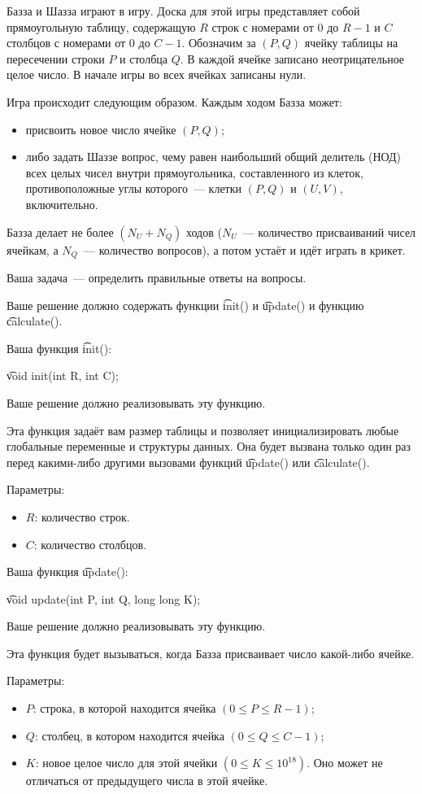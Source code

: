 Базза и Шазза играют в игру. Доска для этой игры представляет собой прямоугольную таблицу, содержащую $R$ строк с номерами от $0$ до $R - 1$ и $C$ столбцов с номерами от $0$ до $C - 1$. Обозначим за $(P, Q)$ ячейку таблицы на пересечении строки $P$ и столбца $Q$. В каждой ячейке записано неотрицательное целое число. В начале игры во всех ячейках записаны нули.

Игра происходит следующим образом. Каждым ходом Базза может:
\begin{itemize}
\item присвоить новое число ячейке $(P, Q)$;
\item либо задать Шаззе вопрос, чему равен наибольший общий делитель (НОД) всех целых чисел внутри прямоугольника, составленного из клеток, противоположные углы которого~--- клетки $(P, Q)$ и $(U, V)$, включительно.
\end{itemize}

Базза делает не более $(N_U + N_Q)$ ходов ($N_U$~--- количество присваиваний чисел ячейкам, а $N_Q$~--- количество вопросов), а потом устаёт и идёт играть в крикет.

Ваша задача~--- определить правильные ответы на вопросы.

Ваше решение должно содержать функции \t{init()} и \t{update()} и функцию \t{calculate()}.

Ваша функция \t{init()}:

\t{void init(int R, int C);}

Ваше решение должно реализовывать эту функцию.

Эта функция задаёт вам размер таблицы и позволяет инициализировать любые глобальные переменные и структуры данных. Она будет вызвана только один раз перед какими-­либо другими вызовами функций \t{update()} или \t{calculate()}.

Параметры:
\begin{itemize}
\item $R$: количество строк.
\item $C$: количество столбцов.
\end{itemize}

Ваша функция \t{update()}:

\t{void update(int P, int Q, long long K);}

Ваше решение должно реализовывать эту функцию.

Эта функция будет вызываться, когда Базза присваивает число какой-­либо ячейке.

Параметры:
\begin{itemize}
\item $P$: строка, в которой находится ячейка $( 0 \leq P \leq R - 1 )$;
\item $Q$: столбец, в котором находится ячейка $( 0 \leq Q \leq C - 1 )$;
\item $K$: новое целое число для этой ячейки $( 0 \leq K \leq 10^{18} )$. Оно может не отличаться от предыдущего числа в этой ячейке.
\end{itemize}

